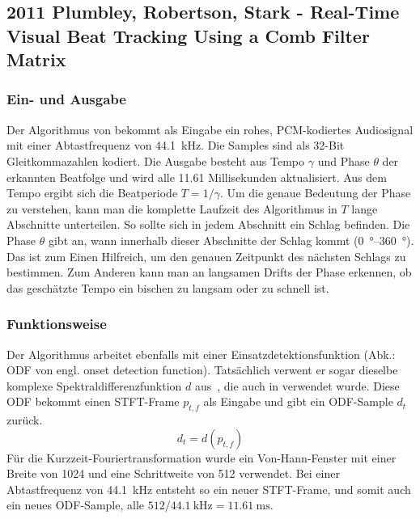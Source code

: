{

	\subsection{2011 Plumbley, Robertson, Stark - Real-Time Visual Beat Tracking Using a Comb Filter Matrix}
	{
		\subsubsection*{Ein- und Ausgabe}
		{
			Der Algorithmus von \cite{2011_PlRoSt} bekommt als Eingabe ein rohes, PCM-kodiertes Audiosignal mit einer Abtastfrequenz von \SI{44.1}{\kilo\hertz}.
			Die Samples sind als 32-Bit Gleitkommazahlen kodiert.
			Die Ausgabe besteht aus Tempo $\gamma$ und Phase $\theta$ der erkannten Beatfolge
				und wird alle \num{11.61} Millisekunden aktualisiert.
			Aus dem Tempo ergibt sich die Beatperiode $T = 1 / \gamma$.
			Um die genaue Bedeutung der Phase zu verstehen,
				kann man die komplette Laufzeit des Algorithmus in $T$ lange Abschnitte unterteilen.
			So sollte sich in jedem Abschnitt ein Schlag befinden.
			Die Phase $\theta$ gibt an,
				wann innerhalb dieser Abschnitte der Schlag kommt (\SIrange{0}{360}{\degree}).
			Das ist zum Einen Hilfreich,
				um den genauen Zeitpunkt des nächsten Schlags zu bestimmen.
			Zum Anderen kann man an langsamen Drifts der Phase erkennen,
				ob das geschätzte Tempo ein bischen zu langsam oder zu schnell ist.
		}

		\subsubsection*{Funktionsweise}
		{
			Der Algorithmus  arbeitet ebenfalls mit einer Einsatzdetektionsfunktion (Abk.: ODF von engl. onset detection function).
			Tatsächlich verwent er sogar dieselbe komplexe Spektraldifferenzfunktion $d$ aus~\cite{2004_BeDaDuSa},
				die auch in \cite{2009_DaPlSt} verwendet wurde.
			Diese ODF bekommt einen STFT-Frame $p_{t, f}$ als Eingabe und gibt ein ODF-Sample $d_t$ zurück.
			\begin{equation}
				d_t = d(p_{t, f})
			\end{equation}
			Für die Kurzzeit-Fouriertransformation wurde ein Von-Hann-Fenster mit einer Breite von \num{1024} und eine Schrittweite von \num{512} verwendet.
			Bei einer Abtastfrequenz von \SI{44.1}{\kilo\hertz} entsteht so ein neuer STFT-Frame,
				und somit auch ein neues ODF-Sample,
				alle $512 / \SI{44.1}{\kilo\hertz} = \SI{11.61}{\milli\second}$.

}}}
